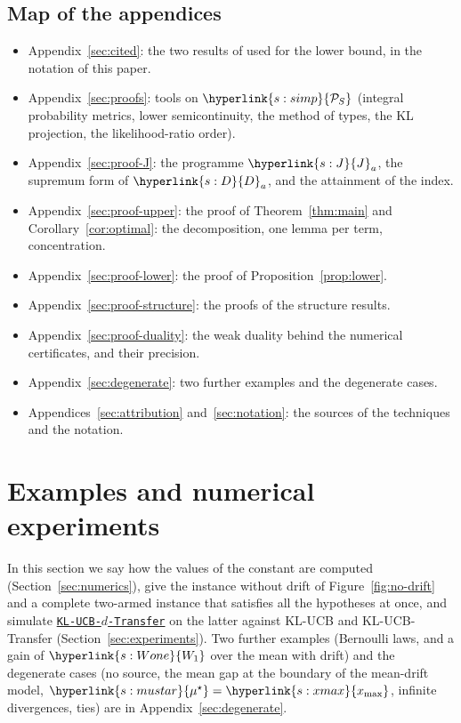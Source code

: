 \documentclass[11pt]{article}
\newcommand{\sy}[2]{{\hyperlink{#1}{#2}}}
\newcommand{\xmax}{\sy{s:xmax}{x_{\max}}}
\newcommand{\Simp}{\sy{s:simp}{\mathcal{P}_{S}}}
\newcommand{\Wone}{\sy{s:Wone}{W_{1}}}
\newcommand{\mus}{\sy{s:mustar}{\mu^{\star}}}
\newcommand{\Jf}{\sy{s:J}{J}}
\newcommand{\Dc}{\sy{s:D}{D}}
\newcommand{\Alg}{\hyperref[alg:index]{\texttt{KL-UCB-$d$-Transfer}}}
\begin{document}
\subsection{Map of the appendices}\label{sec:map}

\begin{itemize}
\item Appendix~\ref{sec:cited}: the two results of \citet{GMS19} used for the lower bound, in the
  notation of this paper.
\item Appendix~\ref{sec:proofs}: tools on $\Simp$ (integral probability metrics, lower
  semicontinuity, the method of types, the KL projection, the likelihood-ratio order).
\item Appendix~\ref{sec:proof-J}: the programme $\Jf_a$, the supremum form of $\Dc_a$, and the attainment
  of the index.
\item Appendix~\ref{sec:proof-upper}: the proof of Theorem~\ref{thm:main} and
  Corollary~\ref{cor:optimal}: the decomposition, one lemma per term, concentration.
\item Appendix~\ref{sec:proof-lower}: the proof of Proposition~\ref{prop:lower}.
\item Appendix~\ref{sec:proof-structure}: the proofs of the structure results.
\item Appendix~\ref{sec:proof-duality}: the weak duality behind the numerical certificates, and
  their precision.
\item Appendix~\ref{sec:degenerate}: two further examples and the degenerate cases.
\item Appendices~\ref{sec:attribution} and~\ref{sec:notation}: the sources of the techniques and the
  notation.
\end{itemize}

\section{Examples and numerical experiments}\label{sec:examples}\label{sec:sanity}

In this section we say how the values of the constant are computed (Section~\ref{sec:numerics}),
give the instance without drift of Figure~\ref{fig:no-drift} and a complete two-armed instance that
satisfies all the hypotheses at once, and simulate \Alg{} on the latter against KL-UCB and
KL-UCB-Transfer (Section~\ref{sec:experiments}). Two further examples (Bernoulli laws, and a gain of
$\Wone$ over the mean with drift) and the degenerate cases (no source, the mean gap at the boundary
of the mean-drift model, $\mus=\xmax$, infinite divergences, ties) are in
Appendix~\ref{sec:degenerate}.
\end{document}
